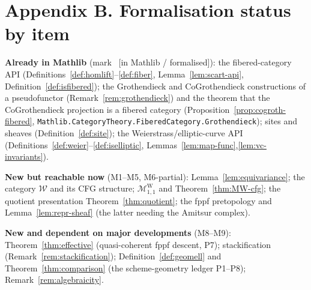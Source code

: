 \documentclass[11pt]{article}
\newcommand{\leanok}{{\footnotesize\textcolor{green!50!black}{\ [in Mathlib / formalised]}}}
\theoremstyle{definition}
\theoremstyle{plain}
\theoremstyle{remark}
\newcommand{\Weier}{\mathcal{W}}
\newcommand{\MW}{\mathcal{M}^{\mathrm{W}}_{1,1}}
\begin{document}
\section*{Appendix B. Formalisation status by item}

\noindent\textbf{Already in Mathlib} (mark \leanok): the fibered-category API
(Definitions~\ref{def:homlift}--\ref{def:fiber},
Lemma~\ref{lem:scart-api}, Definition~\ref{def:isfibered}); the Grothendieck and
CoGrothendieck constructions of a pseudofunctor (Remark~\ref{rem:grothendieck})
and the theorem that the CoGrothendieck projection is a fibered category
(Proposition~\ref{prop:cogroth-fibered},
\texttt{Mathlib.CategoryTheory.FiberedCategory.Grothendieck}); sites and
sheaves (Definition~\ref{def:site}); the Weierstrass/elliptic-curve API
(Definitions~\ref{def:weier}--\ref{def:iselliptic},
Lemmas~\ref{lem:map-func},\ref{lem:vc-invariants}).

\smallskip\noindent\textbf{New but reachable now} (M1--M5, M6-partial):
Lemma~\ref{lem:equivariance}; the category $\Weier$ and its CFG structure;
$\MW$ and Theorem~\ref{thm:MW-cfg}; the quotient presentation
Theorem~\ref{thm:quotient}; the fppf pretopology and
Lemma~\ref{lem:repr-sheaf} (the latter needing the Amitsur complex).

\smallskip\noindent\textbf{New and dependent on major developments} (M8--M9):
Theorem~\ref{thm:effective} (quasi-coherent fppf descent, P7); stackification
(Remark~\ref{rem:stackification}); Definition~\ref{def:geomell} and
Theorem~\ref{thm:comparison} (the scheme-geometry ledger P1--P8);
Remark~\ref{rem:algebraicity}.
\end{document}
